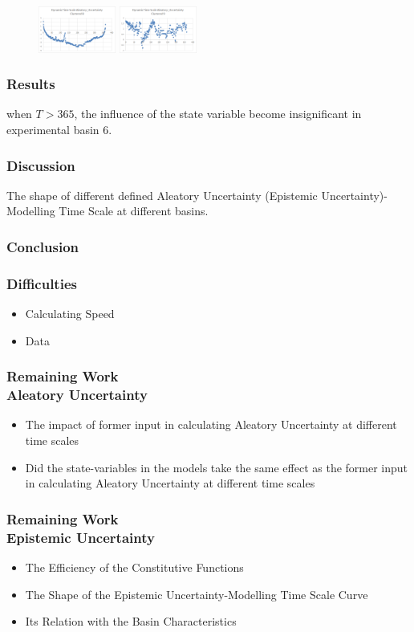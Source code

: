 \documentclass{beamer}
\begin{document}
\begin{frame}
\begin{figure}
  \begin{minipage}[b]{0.2\textwidth} 
    \centering 
    \includegraphics[width=1in]{clustered8.png} 
  \end{minipage} 
  \hspace{0.04\linewidth}%
  \begin{minipage}[b]{0.2\textwidth} 
    \centering 
    \includegraphics[width=1in]{clustered9.png} 
  \end{minipage}
\end{figure}
\end{frame}

\begin{frame}
\frametitle{Results}
when $T>365$, the influence of the state variable become insignificant in experimental basin 6.
\end{frame}

\begin{frame}
\frametitle{Discussion}
The shape of different defined Aleatory Uncertainty (Epistemic Uncertainty)- Modelling Time Scale at different basins.
\end{frame}

\begin{frame}
\frametitle{Conclusion}
\end{frame}


\begin{frame}
\frametitle{Difficulties}
\begin{itemize}
\item Calculating Speed
\item Data 
\end{itemize}
\end{frame}

\begin{frame}
\frametitle{Remaining Work \\Aleatory Uncertainty }
\begin{itemize}
\item The impact of former input in calculating Aleatory Uncertainty at different time scales
\item Did the state-variables in the models take the same effect as the former input in calculating Aleatory Uncertainty at different time scales
 \end{itemize}
\end{frame}

\begin{frame}
\frametitle{Remaining Work \\Epistemic Uncertainty }
\begin{itemize}
\item The Efficiency of the Constitutive Functions
\item The Shape of the Epistemic Uncertainty-Modelling Time Scale Curve
\item Its Relation with the Basin Characteristics
\end{itemize}
\end{frame}
\end{document}
